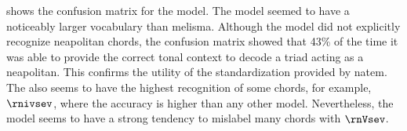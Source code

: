 
 shows the confusion
matrix for the \textcite{chen2021attend} model. The model
seemed to have a noticeably larger vocabulary than
\gls{melisma}. Although the model did not explicitly
recognize \gls{neapolitan} chords, the confusion matrix
showed that 43\% of the time it was able to provide the
correct tonal context to decode a triad acting as a
\gls{neapolitan}. This confirms the utility of the
standardization provided by \gls{natem}. The
\textcite{chen2021attend} also seems to have the highest
recognition of some chords, for example, $\rnivsev$, where
the accuracy is higher than any other model. Nevertheless,
the model seems to have a strong tendency to mislabel many
chords with $\rnVsev$.


